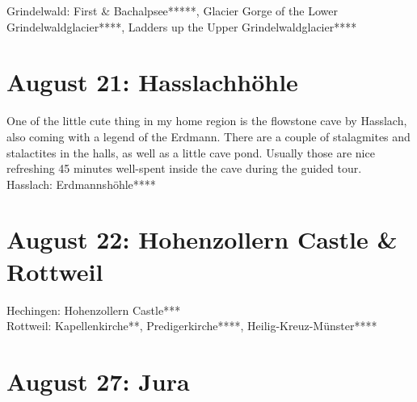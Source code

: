 Grindelwald: First \& Bachalpsee*****, Glacier Gorge of the Lower Grindelwaldglacier****, Ladders up the Upper Grindelwaldglacier****

\section{August 21: Hasslachh\"ohle}
\label{2010Hasslach}

One of the little cute thing in my home region is the flowstone cave by Hasslach, also coming with a legend of the Erdmann. There are a couple of stalagmites and stalactites in the halls, as well as a little cave pond. Usually  those are nice refreshing 45 minutes well-spent inside the cave during the guided tour.\\

Hasslach: Erdmannsh\"ohle****

\section{August 22: Hohenzollern Castle \& Rottweil}
\label{2010Hohenzollern}

Hechingen: Hohenzollern Castle***\\
Rottweil: Kapellenkirche**, Predigerkirche****, Heilig-Kreuz-M\"unster****

\section{August 27: Jura}
\label{jura2010}

